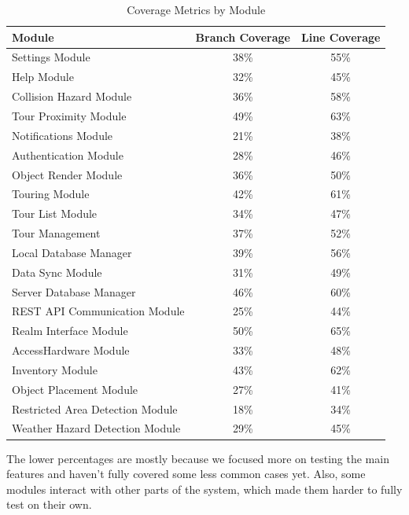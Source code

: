\documentclass[12pt, titlepage]{article}
\begin{document}
\begin{table}[h!]
  \centering
  \begin{tabular}{lcc}
  \hline
  \textbf{Module} & \textbf{Branch Coverage} & \textbf{Line Coverage} \\
  \hline
  Settings Module                    & 38\% & 55\% \\
  Help Module                        & 32\% & 45\% \\
  Collision Hazard Module            & 36\% & 58\% \\
  Tour Proximity Module              & 49\% & 63\% \\
  Notifications Module               & 21\% & 38\% \\
  Authentication Module              & 28\% & 46\% \\
  Object Render Module               & 36\% & 50\% \\
  Touring Module                     & 42\% & 61\% \\
  Tour List Module                   & 34\% & 47\% \\
  Tour Management                    & 37\% & 52\% \\
  Local Database Manager             & 39\% & 56\% \\
  Data Sync Module                   & 31\% & 49\% \\
  Server Database Manager            & 46\% & 60\% \\
  REST API Communication Module      & 25\% & 44\% \\
  Realm Interface Module             & 50\% & 65\% \\
  AccessHardware Module              & 33\% & 48\% \\
  Inventory Module                   & 43\% & 62\% \\
  Object Placement Module            & 27\% & 41\% \\
  Restricted Area Detection Module   & 18\% & 34\% \\
  Weather Hazard Detection Module    & 29\% & 45\% \\
  \hline
  \end{tabular}
  \caption{Coverage Metrics by Module}
  \label{tab:coverage-metrics}
  \end{table}

The lower percentages are mostly because we focused more on testing the main features and haven't fully covered some less common cases yet. Also, some modules interact with other parts of the system, which made them harder to fully test on their own.
  
\end{document}
